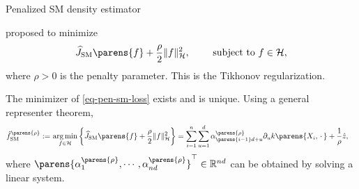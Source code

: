 \documentclass[aspectratio=169,xcolor=dvipsnames]{beamer}
\DeclareMathOperator*{\argmin}{arg\,min}
\newcommand{\SM}{\mathrm{SM}}
\begin{document}
\begin{frame}{Penalized SM density estimator}

	\textcite{Sriperumbudur-density-estimation-inf-exp-family} proposed to minimize
	\begin{align}\label{eq-pen-sm-loss}
		\widehat{J}_{\SM} \parens{f} + \frac{\rho}{2} \Vert f \Vert_{\mathcal{H}}^2, \qquad \text{ subject to } f \in \mathcal{H}, 
	\end{align}
	where $\rho > 0$ is the penalty parameter. This is the {\color{red} Tikhonov regularization}. 
	
	\vspace{10pt}
	
	The minimizer of \eqref{eq-pen-sm-loss} exists and is unique. Using a general representer theorem, 
	\begin{align*}
		\hat{f}_{\SM}^{\parens{\rho}} := & \, \argmin_{f \in \mathcal{H}} \bigg\{\widehat{J}_{\SM} \parens{f} + \frac{\rho}{2} \Vert f \Vert_{\mathcal{H}}^2 \bigg\}  
		= \sum_{i=1}^n \sum_{u=1}^d \alpha_{\parens{i-1}d+u}^{\parens{\rho}} \partial_u k \parens{X_i, \,\cdot\,} + \frac{1}{\rho} \hat{z}, 
	\end{align*}
	where $\parens{\alpha_{1}^{\parens{\rho}}, \cdots, \alpha_{nd}^{\parens{\rho}}}^\top \in \mathbb{R}^{nd}$ can be obtained by solving a linear system. %
	
\end{frame}
\end{document}
